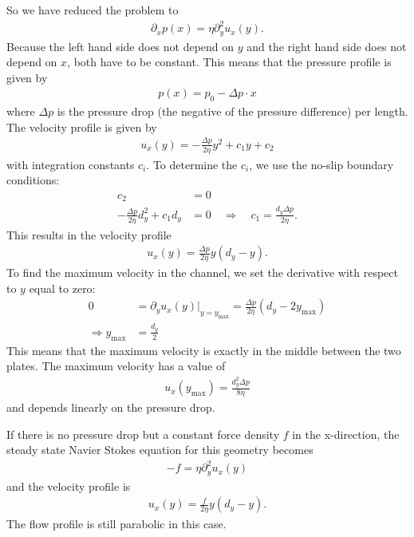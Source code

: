 \documentclass[a4paper,10pt,bibtotoc]{scrartcl}
\begin{document}
So we have reduced the problem to
\begin{align}
 \partial_x p(x) = \eta\partial_y^2 u_x(y).
\end{align}
Because the left hand side does not depend on $y$ and the right hand side does not depend on $x$, both have to be constant. This means that the pressure profile is given by
\begin{align}
 p(x) = p_0 - \Delta p\cdot x
\end{align}
where $\Delta p$ is the pressure drop (the negative of the pressure difference) per length. The velocity profile is given by
\begin{align}
 u_x(y) = -\frac{\Delta p}{2\eta} y^2 + c_1 y + c_2
\end{align}
with integration constants $c_i$. To determine the $c_i$, we use the no-slip boundary conditions:
\begin{align}
 c_2 &= 0\\
 -\frac{\Delta p}{2\eta} d_y^2 + c_1 d_y &= 0\quad\Rightarrow\quad c_1 =\frac{d_y\Delta p}{2\eta}.
\end{align}
This results in the velocity profile 
\begin{align}
 u_x(y) = \frac{\Delta p}{2\eta}y\left(d_y - y\right).
\end{align}
To find the maximum velocity in the channel, we set the derivative with respect to $y$ equal to zero:
\begin{align}
 0 &= \partial_y u_x(y)\bigg\vert_{y = y_\mathrm{max}} = \frac{\Delta p}{2\eta}\left(d_y - 2y_\mathrm{max}\right)\\
 \Rightarrow y_\mathrm{max} &= \frac{d_y}{2}
\end{align}
This means that the maximum velocity is exactly in the middle between the two plates. The maximum velocity has a value of
\begin{align}
 u_x(y_\mathrm{max}) =\frac{d_y^2\Delta p}{8\eta}
\end{align}
and depends linearly on the pressure drop. 

If there is no pressure drop but a constant force density $f$ in the x-direction, the steady state Navier Stokes equation for this geometry becomes
\begin{align}
 -f = \eta\partial_y^2 u_x(y)
\end{align}
and the velocity profile is
\begin{align}
 u_x(y) = \frac{f}{2\eta}y\left(d_y - y\right).
\end{align}
The flow profile is still parabolic in this case.
\end{document}
